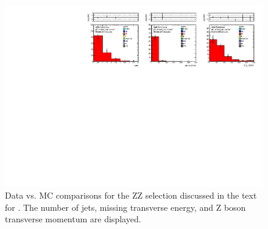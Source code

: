 \begin{figure}[tbh]
\begin{center}
\includegraphics[width=1\linewidth]{plots/ZZ_92fb.pdf}
\caption{\label{fig:zz}\protect 
Data vs. MC comparisons for the ZZ selection discussed in the text for \lumi.
The number of jets, missing transverse energy, and Z boson transverse momentum are displayed.
}
\end{center}
\end{figure}





